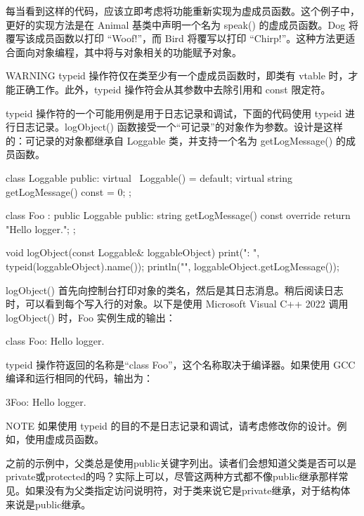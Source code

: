 每当看到这样的代码，应该立即考虑将功能重新实现为虚成员函数。这个例子中，更好的实现方法是在 Animal 基类中声明一个名为 speak() 的虚成员函数。Dog 将覆写该成员函数以打印 “Woof!”，而 Bird 将覆写以打印 “Chirp!”。这种方法更适合面向对象编程，其中将与对象相关的功能赋予对象。

\begin{myWarning}{WARNING}
typeid 操作符仅在类至少有一个虚成员函数时，即类有 vtable 时，才能正确工作。此外，typeid 操作符会从其参数中去除引用和 const 限定符。
\end{myWarning}

typeid 操作符的一个可能用例是用于日志记录和调试，下面的代码使用 typeid 进行日志记录。logObject() 函数接受一个“可记录”的对象作为参数。设计是这样的：可记录的对象都继承自 Loggable 类，并支持一个名为 getLogMessage() 的成员函数。

\begin{cpp}
class Loggable
{
    public:
        virtual ~Loggable() = default;
        virtual string getLogMessage() const = 0;
};

class Foo : public Loggable
{
    public:
        string getLogMessage() const override { return "Hello logger."; }
};

void logObject(const Loggable& loggableObject)
{
    print("{}: ", typeid(loggableObject).name());
    println("{}", loggableObject.getLogMessage());
}
\end{cpp}

logObject() 首先向控制台打印对象的类名，然后是其日志消息。稍后阅读日志时，可以看到每个写入行的对象。以下是使用 Microsoft Visual C++ 2022 调用 logObject() 时，Foo 实例生成的输出：

\begin{shell}
class Foo: Hello logger.
\end{shell}

typeid 操作符返回的名称是“class Foo”，这个名称取决于编译器。如果使用 GCC 编译和运行相同的代码，输出为：

\begin{cpp}
3Foo: Hello logger.
\end{cpp}

\begin{myNotic}{NOTE}
如果使用 typeid 的目的不是日志记录和调试，请考虑修改你的设计。例如，使用虚成员函数。
\end{myNotic}


之前的示例中，父类总是使用public关键字列出。读者们会想知道父类是否可以是private或protected的吗？实际上可以，尽管这两种方式都不像public继承那样常见。如果没有为父类指定访问说明符，对于类来说它是private继承，对于结构体来说是public继承。

